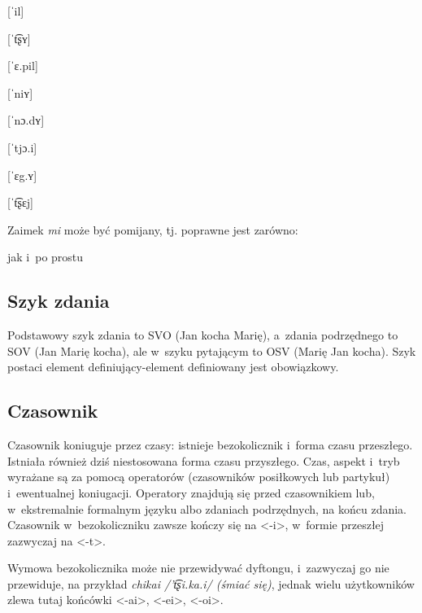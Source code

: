 \begin{spacing}{1.1}
\begin{multicols}{2}
[ˈil]

[ˈt͡ʂʏ]

[ˈɛ.pil]

[ˈniʏ]

[ˈnɔ.dʏ]

[ˈtjɔ.i]

[ˈɛg.ʏ]

[ˈt͡ʂɛj]

\end{multicols}

\noindent
Zaimek \emph{mi} może być pomijany, tj. poprawne jest zarówno: 


\noindent
jak i~po prostu


\subsection{Szyk zdania}

Podstawowy szyk zdania to SVO (Jan kocha Marię), a~zdania podrzędnego to SOV 
(Jan Marię kocha), ale w~szyku pytającym to OSV (Marię Jan kocha). Szyk postaci 
element definiujący-element definiowany jest obowiązkowy.

\subsection{Czasownik}

Czasownik koniuguje przez czasy: istnieje bezokolicznik i~forma czasu 
przeszłego. Istniała również dziś niestosowana forma czasu przyszłego. Czas, 
aspekt i~tryb wyrażane są za pomocą operatorów (czasowników posiłkowych lub 
partykuł) i~ewentualnej koniugacji. Operatory znajdują się przed czasownikiem 
lub, w~ekstremalnie formalnym języku albo zdaniach podrzędnych, na końcu zdania.
 Czasownik w~bezokoliczniku zawsze kończy się na <-i>, w~formie przeszłej
  zazwyczaj na <-t>.

Wymowa bezokolicznika może nie przewidywać dyftongu, i~zazwyczaj go nie przewiduje,
na przykład \emph{chikai /'t͡ʂi.ka.i/ (śmiać się)}, jednak wielu użytkowników 
zlewa tutaj końcówki <-ai>, <-ei>, <-oi>.


\end{spacing}
